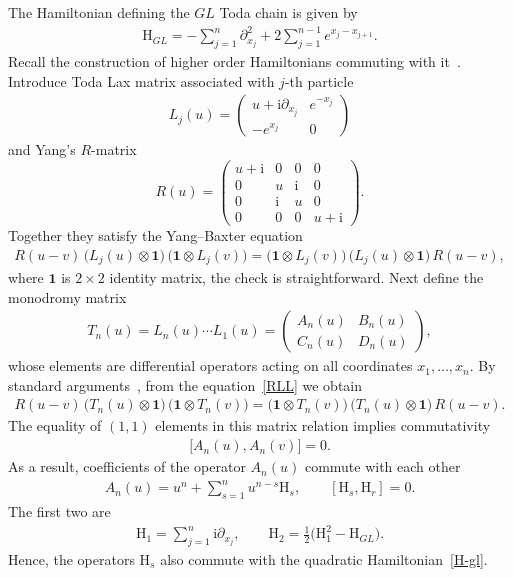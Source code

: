 \documentclass[11pt]{article}
\numberwithin{equation}{section}
\theoremstyle{plain}
\theoremstyle{definition}
\renewcommand{\H}{\mathrm{H}}
\renewcommand{\imath}{\mathrm{i}}
\begin{document}
The Hamiltonian defining the $GL$ Toda chain is given by
\begin{align} \label{H-gl}
	\H_{GL} = - \sum_{j = 1}^n \partial_{x_j}^2 + 2 \sum_{j = 1}^{n - 1} e^{x_j - x_{j + 1}}.
\end{align}
Recall the construction of higher order Hamiltonians commuting with it~\cite{F, Gaud, Skl0}.
Introduce Toda Lax matrix associated with $j$-th particle 
\begin{align} \label{L-toda}
	L_j(u) = 
	\begin{pmatrix}
		u + \imath \partial_{x_j} & e^{-x_j} \\[4pt]
		-e^{x_j} & 0
	\end{pmatrix}
\end{align}
and Yang's $R$-matrix
\begin{equation} \label{R-yang}
	R(u) = 
	\begin{pmatrix}
		u + \imath & 0 & 0 & 0 \\
		0 & u & \imath & 0 \\
		0 & \imath & u & 0 \\
		0 & 0 & 0 & u + \imath
	\end{pmatrix}.
\end{equation}
Together they satisfy the Yang--Baxter equation
\begin{align}\label{RLL}
	R(u - v) \, \bigl( L_j(u) \otimes \bm{1} \bigr) \, \bigl( \bm{1} \otimes L_j(v) \bigr) = \bigl( \bm{1} \otimes L_j(v) \bigr) \,  \bigl( L_j(u) \otimes \bm{1} \bigr) \, R(u - v),
\end{align}
where $\bm{1}$ is $2 \times 2$ identity matrix, the check is straightforward. Next define the monodromy matrix
\begin{align} \label{Tn}
	T_n(u) = L_n(u) \cdots L_1(u) = 
	\begin{pmatrix}
		A_n(u) & B_n(u) \\[4pt]
		C_n(u) & D_n(u)
	\end{pmatrix},
\end{align}
whose elements are differential operators acting on all coordinates $x_1, \dots, x_n$. By standard arguments~\cite[Proposition 3.1]{Sl}, from the equation~\eqref{RLL} we obtain 
\begin{align} \label{RTT}
	R(u - v) \, \bigl( T_n(u) \otimes \bm{1} \bigr) \, \bigl( \bm{1} \otimes T_n(v) \bigr) = \bigl( \bm{1} \otimes T_n(v) \bigr) \,  \bigl( T_n(u) \otimes \bm{1} \bigr) \, R(u - v).
\end{align}
The equality of $(1,1)$ elements in this matrix relation implies commutativity
\begin{align}
	\bigl[ A_n(u), A_n(v) \bigr] = 0.
\end{align}
As a result, coefficients of the operator $A_n(u)$ commute with each other
\begin{align}
	A_n(u) = u^n + \sum_{s = 1}^n u^{n - s} \H_s, \qquad 	[\H_s, \H_r] = 0.
\end{align}
The first two are
\begin{align}
	\H_1 = \sum_{j = 1}^n \imath \partial_{x_j}, \qquad \H_2 = \frac{1}{2} \bigl( \H_1^2 - \H_{GL} \bigr).
\end{align}
Hence, the operators $\H_s$ also commute with the quadratic Hamiltonian~\eqref{H-gl}.
\end{document}
